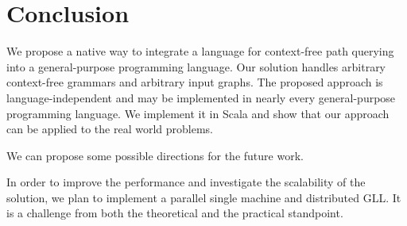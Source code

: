 \section{Conclusion}
\label{sec:conclusion}

We propose a native way to integrate a language for context-free path querying into a general-purpose programming language.
Our solution handles arbitrary context-free grammars and arbitrary input graphs.
The proposed approach is language-independent and may be implemented in nearly every general-purpose programming language.
We implement it in Scala and show that our approach can be applied to the real world problems.


We can propose some possible directions for the future work.

%
In order to improve the performance and investigate the scalability of the solution, we plan to implement a parallel single machine and distributed GLL. 
It is a challenge from both the theoretical and the practical standpoint.


